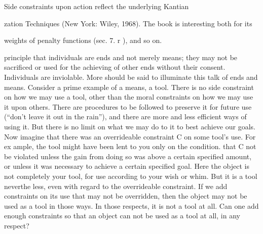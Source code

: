 \documentclass[11pt,openany]{book}
\begin{document}
Side constraints upon action reflect the underlying Kantian 

zation Techniques (New York: Wiley, 1968). The book is interesting both for its 

weights of penalty functions (sec. 7. r ), and so on. 

principle that individuals are ends and not merely means; they may not be sacrificed or used for the achieving of other ends without their consent. Individuals are inviolable. More should be said to illuminate this talk of ends and means. Consider a prime example of a means, a tool. There is no side constraint on how we may use a tool, other than the moral constraints on how we may use it upon others. There are procedures to be followed to preserve it for future use (``don't leave it out in the rain''), and there are more and less efficient ways of using it. But there is no limit on what we may do to it to best achieve our goals. Now imagine that there was an overrideable constraint C on some tool's use. For ex ample, the tool might have been lent to you only on the condition. that C not be violated unless the gain from doing so was above a certain specified amount, or unless it was necessary to achieve a certain specified goal. Here the object is not completely your tool, for use according to your wish or whim. But it is a tool neverthe less, even with regard to the overrideable constraint. If we add constraints on its use that may not be overridden, then the object may not be used as a tool in those ways. In those respects, it is not a tool at all. Can one add enough constraints so that an object can not be used as a tool at all, in any respect? 
\end{document}
